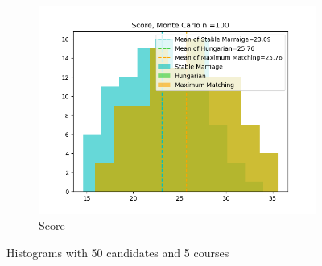 \documentclass[twoside,twocolumn]{article}
\begin{document}
\begin{figure}[t]
        ~
        \begin{subfigure}{0.32\textwidth}
            \centering
            \includegraphics[width=\textwidth]{../figures/50candidates_5courses_100simulations/scores.png}
            \caption{Score}
        \end{subfigure}
        \caption{Histograms with 50 candidates and 5 courses}
        \label{fig:50can_5cou}
    \end{figure}
\end{document}
